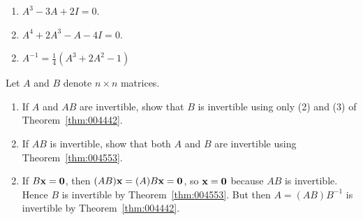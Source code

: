 \begin{multicols}{2}
\begin{ex}
\begin{enumerate}[label={\alph*.}]
\item $A^{3} - 3A + 2I = 0$.

\item $A^{4} + 2A^{3} - A - 4I = 0$.

\end{enumerate}
\begin{sol}
\begin{enumerate}[label={\alph*.}]
\setcounter{enumi}{1}
\item $A^{-1} = \frac{1}{4} (A^3 +2A^2-1)$
\end{enumerate}
\end{sol}
\end{ex}

\begin{ex}
Let $A$ and $B$ denote $n \times n$ matrices.


\begin{enumerate}[label={\alph*.}]
\item If $A$ and $AB$ are invertible, show that $B$ is invertible using only (2) and (3) of Theorem~\ref{thm:004442}.

\item If $AB$ is invertible, show that both $A$ and $B$ are invertible using Theorem~\ref{thm:004553}.

\end{enumerate}
\begin{sol}
\begin{enumerate}[label={\alph*.}]
\setcounter{enumi}{1}
\item  If $B\textbf{x} = \textbf{0}$, then $(AB)\textbf{x} = (A)B\textbf{x} = \textbf{0}$, so $\textbf{x} = \textbf{0}$ because $AB$ is invertible. Hence $B$ is invertible by Theorem~\ref{thm:004553}. But then $A = (AB)B^{-1}$ is invertible by Theorem~\ref{thm:004442}.

\end{enumerate}
\end{sol}
\end{ex}


\end{multicols}
